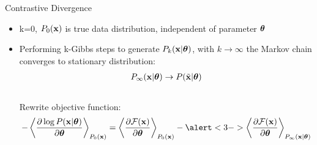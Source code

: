 	\begin{frame}[t]{Contrastive Divergence}
	 \begin{itemize}
	    \itemsep10pt
	    \item k=0, $P_0(\mathbf{x})$ is true data distribution, independent of parameter $\boldsymbol{\theta}$
	    \item Performing k-Gibbs steps to generate $P_k(\mathbf{x}|\boldsymbol{\theta})$, with $k\rightarrow \infty$ the Markov chain converges to stationary distribution:
		  \begin{align}
		      P_{\infty}(\mathbf{x}|\boldsymbol{\theta}) \rightarrow P(\tilde{\mathbf{x}}|\boldsymbol{\theta})\nonumber
		  \end{align}\\
	    \only<2->
	    {Rewrite objective function:
		  \begin{align}
		   - \left\langle\frac{\partial  \log P(\x|\btheta)}{\partial \boldsymbol{\theta}}\right\rangle_{P_0(\x)} = \left\langle \frac{\partial \mathcal{F}(\x)}{\partial \boldsymbol{\theta}}\right\rangle_{P_0(\x)} -\alert<3->{
					  \left\langle \frac{\partial \mathcal{F}(\x)}{\partial \boldsymbol{\theta}}\right\rangle_{P_{\infty}(\x|\btheta)}\nonumber}
		  \end{align}
	    }
	 \end{itemize}
	  
	 
	\end{frame}
	
